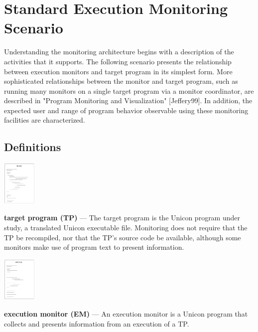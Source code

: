 \section{Standard Execution Monitoring Scenario}

Understanding the monitoring architecture begins with a description of the
activities that it supports.  The following scenario presents the
relationship between execution monitors and target program in its
simplest form.  More sophisticated relationships between the monitor and
target program, such as running many monitors on a single
target program via a monitor coordinator, are described
in "Program Monitoring and Visualization" [Jeffery99].
In addition, the expected user and range of program behavior observable
using these monitoring facilities are characterized.


\subsection*{Definitions}

\flushleft
\includegraphics[width=0.65in,height=0.85in]{tp.png}
\vspace{-.58in}\hspace{0.5in}\parbox{27pc}{{\bf target program (TP)} ---
The target program is the Unicon program under study, a translated Unicon
executable file.
Monitoring does not require that the TP be recompiled, nor that
the TP's source code be available, although some monitors make use of
program text to present information.}

\vspace{0.2in}

\flushleft
\includegraphics[width=0.65in,height=0.85in]{em.png}
\vspace{-0.85in}\hspace{0.5in}\parbox{27pc}{{\bf execution monitor (EM)} ---
An execution monitor is a Unicon program that collects and presents
information from an execution of a TP.}

